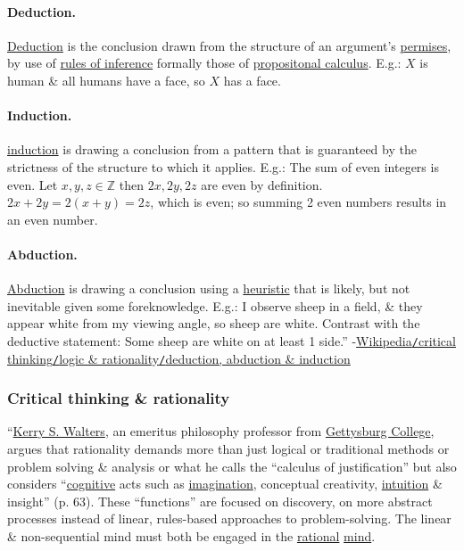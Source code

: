 \documentclass[oneside]{book}
\numberwithin{equation}{section}
\begin{document}
\paragraph{Deduction.} \href{https://en.wikipedia.org/wiki/Deductive_reasoning}{Deduction} is the conclusion drawn from the structure of an argument's \href{https://en.wikipedia.org/wiki/Premises}{permises}, by use of \href{https://en.wikipedia.org/wiki/Rules_of_inference}{rules of inference} formally those of \href{https://en.wikipedia.org/wiki/Propositional_calculus#Basic_and_derived_argument_forms}{propositonal calculus}. E.g.: $X$ is human \& all humans have a face, so $X$ has a face.

\paragraph{Induction.} \href{https://en.wikipedia.org/wiki/Inductive_reasoning}{induction} is drawing a conclusion from a pattern that is guaranteed by the strictness of the structure to which it applies. E.g.: The sum of even integers is even. Let $x,y,z\in\mathbb{Z}$ then $2x,2y,2z$ are even by definition. $2x + 2y = 2(x + y) = 2z$, which is even; so summing 2 even numbers results in an even number.

\paragraph{Abduction.} \href{https://en.wikipedia.org/wiki/Abductive_reasoning}{Abduction} is drawing a conclusion using a \href{https://en.wikipedia.org/wiki/Heuristic}{heuristic} that is likely, but not inevitable given some foreknowledge. E.g.: I observe sheep in a field, \& they appear white from my viewing angle, so sheep are white. Contrast with the deductive statement: Some sheep are white on at least 1 side.'' -\href{https://en.wikipedia.org/wiki/Critical_thinking#Deduction,_abduction_and_induction}{Wikipedia\texttt{/}critical thinking\texttt{/}logic \& rationality\texttt{/}deduction, abduction \& induction}

\subsubsection{Critical thinking \& rationality}
``\href{https://en.wikipedia.org/wiki/Kerry_S._Walters}{Kerry S. Walters}, an emeritus philosophy professor from \href{https://en.wikipedia.org/wiki/Gettysburg_College}{Gettysburg College}, argues that rationality demands more than just logical or traditional methods or problem solving \& analysis or what he calls the ``calculus of justification'' but also considers ``\href{https://en.wikipedia.org/wiki/Cognitive}{cognitive} acts such as \href{https://en.wikipedia.org/wiki/Imagination}{imagination}, conceptual creativity, \href{https://en.wikipedia.org/wiki/Intuition}{intuition} \& insight'' (p. 63). These ``functions'' are focused on discovery, on more abstract processes instead of linear, rules-based approaches to problem-solving. The linear \& non-sequential mind must both be engaged in the \href{https://en.wikipedia.org/wiki/Rational}{rational} \href{https://en.wikipedia.org/wiki/Mind}{mind}.
\end{document}
